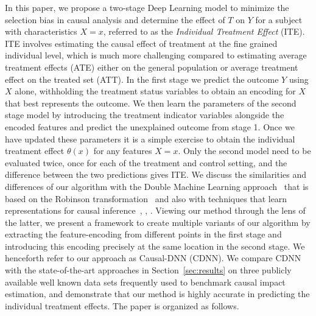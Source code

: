 \documentclass[sigconf]{acmart}
\newcommand{\eat}[1]{}
\theoremstyle{plain}
\numberwithin{equation}{section}
\begin{document}
In this paper, we propose a two-stage Deep Learning model to minimize the selection bias in causal analysis and determine the effect of $T$ on $Y$ for a subject with characteristics $X=x$, referred to as the \emph{Individual Treatment Effect} (ITE). ITE involves estimating the causal effect of treatment at the fine grained individual level, which is much more challenging compared to estimating average treatment effects (ATE) either on the general population or average treatment effect on the treated set (ATT). In the first stage we predict the outcome $Y$ using $X$ alone, withholding the treatment status variables to obtain an encoding for $X$ that best represents the outcome. We then learn the parameters of the second stage model by introducing the treatment indicator variables alongside the encoded features and predict the unexplained outcome from stage 1. Once we have updated these parameters it is a simple exercise to obtain the individual treatment effect $\theta(x)$ for any features $X=x$. Only the second model need to be evaluated twice, once for each of the treatment and control setting, and the difference between the two predictions gives ITE. We discuss the similarities and differences of our algorithm with the Double Machine Learning approach~\cite{doubleMLdebiased} that is based on the Robinson transformation~\cite{RobinsonTransformation} and also with techniques that learn representations for causal inference~\cite{blrJohansson}, \cite{dnnShalit}, \cite{Dragonnet}. Viewing our method through the lens of the latter, we present a framework to create multiple variants of our algorithm by extracting the feature-encoding from different points in the first stage and introducing this encoding precisely at the same location in the second stage. We henceforth refer to our approach as Causal-DNN (CDNN). We compare CDNN with the state-of-the-art approaches in Section~\ref{sec:results} on three publicly available well known data sets frequently used to benchmark causal impact estimation, and demonstrate that our method is highly accurate in predicting the individual treatment effects. The paper is organized as follows. 

\eat{Our algorithm has several advantages over conventional algorithms like OLS, Propensity matching, and other state-of-the-art algorithms in terms of (i) controlling selection bias, (ii) improving scalability for multiple treatments simultaneously, (iii) computing incremental effect on multiple outcome variables simultaneously, (iv) computing heterogeneous treatment effect, (v) computing impact of increased participation of an event, (vi) nth participation impact, (vii) interaction effects of events {\it etc.} as described in Section~\ref{sec:usecases}.}
\end{document}
